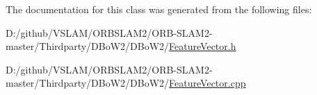 The documentation for this class was generated from the following files\+:\begin{DoxyCompactItemize}
\item 
D\+:/github/\+V\+S\+L\+A\+M/\+O\+R\+B\+S\+L\+A\+M2/\+O\+R\+B-\/\+S\+L\+A\+M2-\/master/\+Thirdparty/\+D\+Bo\+W2/\+D\+Bo\+W2/\mbox{\hyperlink{_feature_vector_8h}{Feature\+Vector.\+h}}\item 
D\+:/github/\+V\+S\+L\+A\+M/\+O\+R\+B\+S\+L\+A\+M2/\+O\+R\+B-\/\+S\+L\+A\+M2-\/master/\+Thirdparty/\+D\+Bo\+W2/\+D\+Bo\+W2/\mbox{\hyperlink{_feature_vector_8cpp}{Feature\+Vector.\+cpp}}\end{DoxyCompactItemize}
